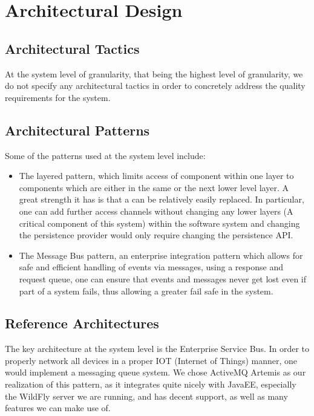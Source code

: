 \documentclass[11pt,a4paper]{article}
\begin{document}
\section{Architectural Design}
\subsection{Architectural Tactics}
At the system level of granularity, that being the highest level of granularity, we do not specify any architectural tactics in order to concretely address the quality requirements for the system.
\subsection{Architectural Patterns}
Some of the patterns used at the system level include:
\begin{itemize}
	\item The layered pattern, which limits access of component within one layer to components which are either in the same or the next lower level layer. A great strength it has is that a can be relatively easily replaced. In particular, one can add further access channels without changing any lower layers (A critical component of this system) within the software system and changing the persistence provider would only require changing the persistence API.
	\item The Message Bus pattern, an enterprise integration pattern which allows for safe and efficient handling of events via messages, using a response and request queue, one can ensure that events and messages never get lost even if part of a system fails, thus allowing a greater fail safe in the system.
\end{itemize}
\subsection{Reference Architectures}
The key architecture at the system level is the Enterprise Service Bus. In order to properly network all devices in a proper IOT (Internet of Things) manner, one would implement a messaging queue system. We chose ActiveMQ Artemis as our realization of this pattern, as it integrates quite nicely with JavaEE, especially the WildFly server we are running, and has decent support, as well as many features we can make use of.

\pagebreak
\end{document}
